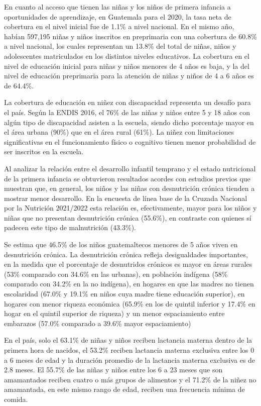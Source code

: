 En cuanto al acceso que tienen las niñas y los niños de primera infancia a
oportunidades de aprendizaje, en Guatemala para el 2020, la tasa neta de
cobertura en el nivel inicial fue de 1.1\% a nivel nacional. En el mismo año,
habían 597,195 niñas y niños inscritos en preprimaria con una cobertura de
60.8\% a nivel nacional, los cuales representan un 13.8\% del total de niñas,
niños y adolescentes matriculados en los distintos niveles educativos.
\cite{PoliticaInfanciaGuate} La cobertura en el nivel de educación inicial para
niñas y niños menores de 4 años es baja, y la del nivel de educación
preprimaria para la atención de niñas y niños de 4 a 6 años es de 64.4\%.
\cite{MineducEstadistica}

La cobertura de educación en niñez con discapacidad representa un desafío para
el país. Según la ENDIS 2016, el 76\% de las niñas y niños entre 5 y 18 años
con algún tipo de discapacidad asisten a la escuela, siendo dicho porcentaje
mayor en el área urbana (90\%) que en el área rural (61\%). La niñez con
limitaciones significativas en el funcionamiento físico o cognitivo tienen
menor probabilidad de ser inscritos en la escuela. \cite{PoliticaInfanciaGuate}

Al analizar la relación entre el desarrollo infantil temprano y el estado
nutricional de la primera infancia se obtuvieron resultados acordes con
estudios previos que muestran que, en general, los niños y las niñas con
desnutrición crónica tienden a mostrar menor desarrollo. En la encuesta de
línea base de la Cruzada Nacional por la Nutrición 2021/2022 \cite{SESAN2022}
esta relación es, efectivamente, mayor para los niños y niñas que no presentan
desnutrición crónica (55.6\%), en contraste con quienes sí padecen
este tipo de malnutrición (43.3\%).

Se estima que 46.5\% de los niños guatemaltecos menores de 5 años viven en
desnutrición crónica. La desnutrición crónica refleja desigualdades
importantes, en la medida que el porcentaje de desnutridos crónicos es mayor en
áreas rurales (53\% comparado con 34.6\% en las urbanas), en población indígena
(58\% comparado con 34.2\% en la no indígena), en hogares en que las madres no
tienen escolaridad (67.0\% y 19.1\% en niños cuya madre tiene educación
superior), en hogares con menor riqueza económica (65.9\% en los de quintil
inferior y 17.4\% en hogar en el quintil superior de riqueza) y un menor
espaciamiento entre embarazos (57.0\% comparado a 39.6\% mayor espaciamiento)
\cite{EnMaternoInfantil}

En el país, solo el 63.1\% de niñas y niños reciben lactancia materna dentro de
la primera hora de nacidos, el 53.2\% reciben lactancia materna exclusiva entre
los 0 a 6 meses de edad y la duración promedio de la lactancia materna
exclusiva es de 2.8 meses. El 55.7\% de las niñas y niños entre los 6 a 23
meses que son amamantados reciben cuatro o más grupos de alimentos y el 71.2\%
de la niñez no amamantada, en este mismo rango de edad, reciben una frecuencia
mínima de comida. \cite{EnMaternoInfantil} \cite{PoliticaInfanciaGuate}

